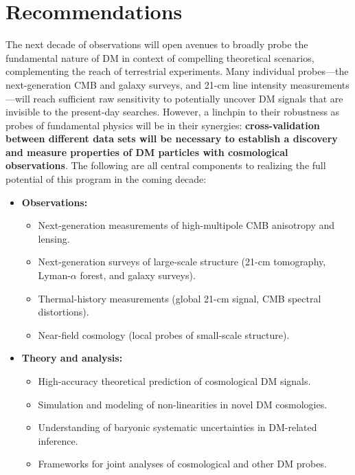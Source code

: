 \documentclass[12pt]{article}
\begin{document}
\section{Recommendations}
\label{sec:recommendations}
\vspace{-0.2cm}
The next decade of observations will open avenues to broadly probe the fundamental nature of DM in context of compelling theoretical scenarios, complementing the reach of terrestrial experiments.
Many individual probes---the next-generation CMB and galaxy surveys, and 21-cm line intensity measurements---will reach sufficient raw sensitivity to potentially uncover DM signals that are invisible to the present-day searches.
However, a linchpin to their robustness as probes of fundamental physics will be in their synergies: \textbf{cross-validation between different data sets will be necessary to establish a discovery and measure properties of DM particles with cosmological observations}. 
The following are all central components to realizing the full potential of this program in the coming decade:
\vspace{-0.cm}
\begin{itemize}
    \item \textbf{Observations:}
    \begin{itemize}
        \item Next-generation measurements of high-multipole CMB anisotropy and lensing.
        \item Next-generation surveys of large-scale structure (21-cm tomography, Lyman-$\alpha$ forest, and galaxy surveys).
        \item Thermal-history measurements (global 21-cm signal, CMB spectral distortions).
        \item Near-field cosmology (local probes of small-scale structure).
    \end{itemize}
    \vspace{-0.2cm}
    \item \textbf{Theory and analysis:}
    \begin{itemize}
        \item High-accuracy theoretical prediction of cosmological DM signals.
        \item Simulation and modeling of non-linearities in novel DM cosmologies.
        \item Understanding of baryonic systematic uncertainties in DM-related inference.
        \item Frameworks for joint analyses of cosmological and other DM probes.
        \end{itemize}
\end{itemize}
\pagebreak


\end{document}
